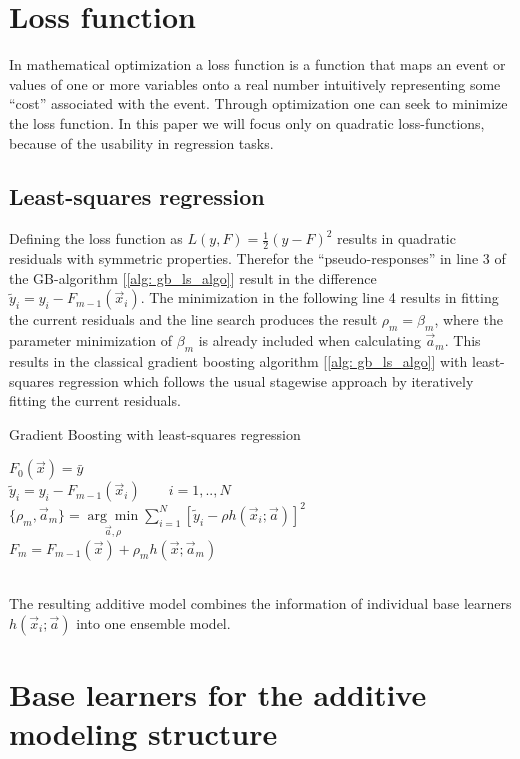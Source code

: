 \documentclass[12pt, a4paper]{article}
\begin{document}
\newpage
\section{Loss function}
In mathematical optimization a loss function is a function that maps an event or values of one or more variables onto a real number intuitively representing some ``cost'' associated with the event. Through optimization one can seek to minimize the loss function. In this paper we will focus only on quadratic loss-functions, because of the usability in regression tasks.
\subsection{Least-squares regression}
Defining the loss function as $L(y,F) = \frac{1}{2} (y - F)^2$ results in quadratic residuals with symmetric properties. Therefor the ``pseudo-responses'' in line 3 of the GB-algorithm [\ref{alg: gb_ls_algo}] result in the difference $\tilde{y}_i = y_i - F_{m-1}(\vec{x}_i)$. The minimization in the following line 4 results in fitting the current residuals and the line search produces the result $\rho_m = \beta_m$, where the parameter minimization of $\beta_m$ is already included when calculating $\vec{a}_m$. This results in the classical gradient boosting algorithm [\ref{alg: gb_ls_algo}] with least-squares regression which follows the usual stagewise approach by iteratively fitting the current residuals.
\begin{algorithm}
\caption{Gradient Boosting with least-squares regression \cite{Friedman2001}}
\label{alg: gb_ls_algo}
    $F_0(\vec{x}) = \bar{y}$ \\
    {
    $\tilde{y}_i = y_i - F_{m-1}(\vec{x}_i) \qquad i = 1,..,N$ \\
    $\{\rho_m, \vec{a}_m \} = \underset{ \vec{a}, \rho }{\arg\min}
    \sum_{i=1}^N [\tilde{y}_i - \rho h(\vec{x}_i;\vec{a})]^2$ \\
    $F_{m} = F_{m-1}(\vec{x}) + \rho_m h(\vec{x};\vec{a}_m)$
    }
\end{algorithm}
\\
The resulting additive model combines the information of individual base learners $h(\vec{x}_i;\vec{a})$ into one ensemble model.
\newpage
\section{Base learners for the additive modeling structure}
\end{document}
